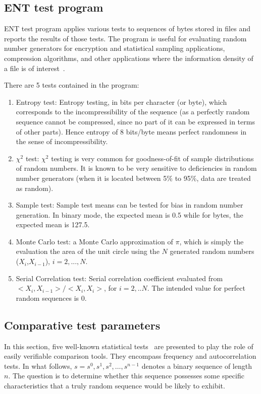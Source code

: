 \subsection{ENT test program}
%
ENT test program applies various tests to sequences of bytes stored in
files and reports the results of those tests. The program is useful
for evaluating random number generators for encryption and statistical
sampling applications, compression algorithms, and other applications
where the information density of a file is of interest~\cite{ent}.

There are 5 tests contained in the program:
%
\begin{enumerate}
\item Entropy test: Entropy testing, in bits per character (or byte), which
  corresponds to the incompressibility of the sequence (as a perfectly
  random sequence cannot be compressed, since no part of it can be
  expressed in terms of other parts). Hence entropy of 8 bits/byte
  means perfect randomness in the sense of incompressibility.
\item $\chi^2$ test: $\chi^2$ testing is very common for
  goodness-of-fit of sample distributions of random numbers. It is
  known to be very sensitive to deficiencies in random number
  generators (when it is located between 5\% to 95\%, data are treated
  as random).
\item Sample test: Sample test means can be tested for bias in random
  number generation. In binary mode, the expected mean is 0.5 while
  for bytes, the expected mean is 127.5.
\item Monte Carlo test: a Monte Carlo approximation of $\pi$, which is
  simply the evaluation the area of the unit circle using the $N$
  generated random numbers ($X_i$,$X_{i-1}$), $i = 2,...,N$.
\item Serial Correlation test: Serial correlation coefficient
  evaluated from $<X_i,X_{i-1}>/<X_i,X_i>$, for $i=2,..N$. The
  intended value for perfect random sequences is 0.
\end{enumerate}

\subsection{Comparative test parameters}

In this section, five well-known statistical tests~\cite{Menezes1997} are presented to play the role of easily verifiable comparison tools. They encompass frequency and autocorrelation tests. In what follows, $s = s^0,s^1,s^2,\dots , s^{n-1}$ denotes a binary sequence of length $n$. The question is to determine whether this sequence possesses some specific characteristics that a truly random sequence would be likely to exhibit. 


